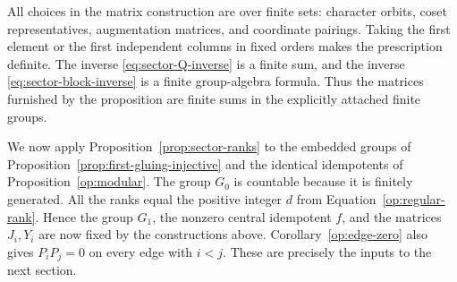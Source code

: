 All choices in the matrix construction are over finite sets: character orbits, coset
representatives, augmentation matrices, and coordinate pairings.
Taking the first element or the first independent columns in fixed
orders makes the prescription definite.  The inverse
\eqref{eq:sector-Q-inverse} is a finite sum, and the inverse
\eqref{eq:sector-block-inverse} is a finite group-algebra formula.
Thus the matrices furnished by the proposition are finite sums in
the explicitly attached finite groups.

We now apply Proposition~\ref{prop:sector-ranks} to the embedded groups
of Proposition~\ref{prop:first-gluing-injective} and the identical
idempotents of Proposition~\ref{op:modular}. The group $G_0$
is countable because it is finitely generated. All the ranks equal the
positive integer $d$ from Equation~\eqref{op:regular-rank}.
Hence the group $G_1$, the nonzero central idempotent $f$, and the
matrices $J_i,Y_i$ are now fixed by the constructions above.
Corollary~\ref{op:edge-zero} also gives $P_iP_j=0$ on every
edge with $i<j$. These are precisely the inputs to the next section.

